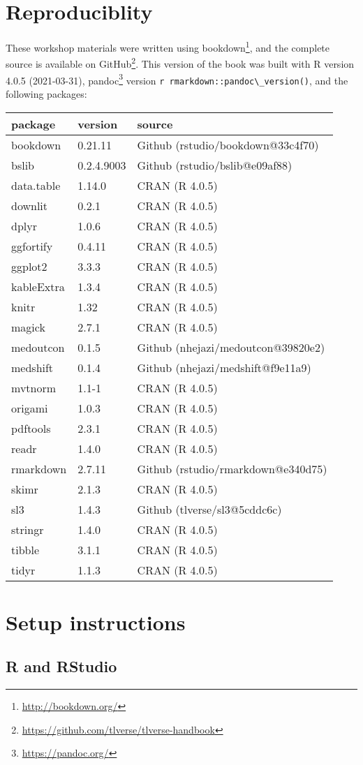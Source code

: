 \documentclass[
  12pt,
]{book}
\newcommand{\passthrough}[1]{#1}
\renewcommand{\href}[2]{#2\footnote{\url{#1}}}
\theoremstyle{definition}
\theoremstyle{definition}
\theoremstyle{definition}
\newcommand{\1}{\mathbbm{1}}
\begin{document}
\hypertarget{repro}{%
\section{Reproduciblity}\label{repro}}

These workshop materials were written using \href{http://bookdown.org/}{bookdown},
and the complete source is available on
\href{https://github.com/tlverse/tlverse-handbook}{GitHub}. This version of the book
was built with R version 4.0.5 (2021-03-31), \href{https://pandoc.org/}{pandoc} version \passthrough{\lstinline!r rmarkdown::pandoc\_version()!}, and the following packages:

\begin{longtable}[]{@{}lll@{}}
\toprule
package & version & source\tabularnewline
\midrule
\endhead
bookdown & 0.21.11 & Github (rstudio/bookdown@33c4f70)\tabularnewline
bslib & 0.2.4.9003 & Github (rstudio/bslib@e09af88)\tabularnewline
data.table & 1.14.0 & CRAN (R 4.0.5)\tabularnewline
downlit & 0.2.1 & CRAN (R 4.0.5)\tabularnewline
dplyr & 1.0.6 & CRAN (R 4.0.5)\tabularnewline
ggfortify & 0.4.11 & CRAN (R 4.0.5)\tabularnewline
ggplot2 & 3.3.3 & CRAN (R 4.0.5)\tabularnewline
kableExtra & 1.3.4 & CRAN (R 4.0.5)\tabularnewline
knitr & 1.32 & CRAN (R 4.0.5)\tabularnewline
magick & 2.7.1 & CRAN (R 4.0.5)\tabularnewline
medoutcon & 0.1.5 & Github (nhejazi/medoutcon@39820e2)\tabularnewline
medshift & 0.1.4 & Github (nhejazi/medshift@f9e11a9)\tabularnewline
mvtnorm & 1.1-1 & CRAN (R 4.0.5)\tabularnewline
origami & 1.0.3 & CRAN (R 4.0.5)\tabularnewline
pdftools & 2.3.1 & CRAN (R 4.0.5)\tabularnewline
readr & 1.4.0 & CRAN (R 4.0.5)\tabularnewline
rmarkdown & 2.7.11 & Github (rstudio/rmarkdown@e340d75)\tabularnewline
skimr & 2.1.3 & CRAN (R 4.0.5)\tabularnewline
sl3 & 1.4.3 & Github (tlverse/sl3@5cddc6c)\tabularnewline
stringr & 1.4.0 & CRAN (R 4.0.5)\tabularnewline
tibble & 3.1.1 & CRAN (R 4.0.5)\tabularnewline
tidyr & 1.1.3 & CRAN (R 4.0.5)\tabularnewline
\bottomrule
\end{longtable}

\hypertarget{setup}{%
\section{Setup instructions}\label{setup}}

\hypertarget{r-and-rstudio}{%
\subsection{R and RStudio}\label{r-and-rstudio}}
\end{document}
